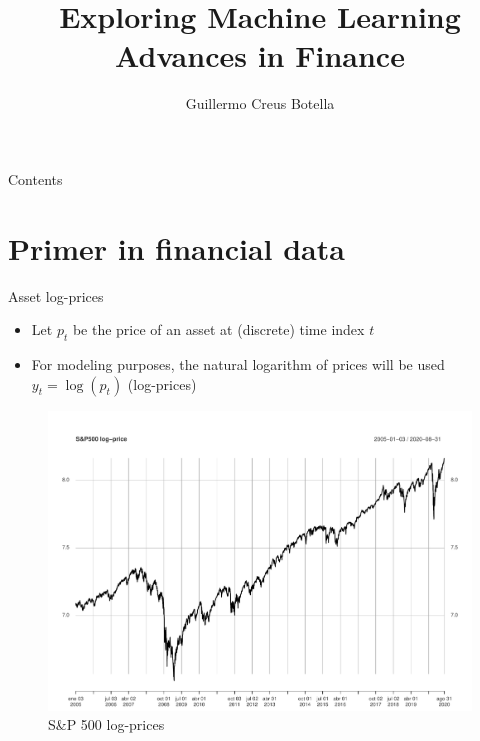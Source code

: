 \documentclass{beamer} %
\title[Exploring ML Advances in Finance]
{Exploring Machine Learning Advances in Finance}
\author[GCB]{Guillermo Creus Botella}
\date{\displaydate{date}}
\begin{document}
\begin{frame}
	\maketitle
\end{frame}

\begin{frame}{Contents}
	\tableofcontents
\end{frame}

\section{Primer in financial data}
\begin{frame}{Asset log-prices}
	\begin{itemize}
		\item Let $p_t$ be the price of an asset at (discrete) time index $t$
		
		\item For modeling purposes, the natural logarithm of prices will be 
		used $y_t = \log (p_t)$ (log-prices)
	\end{itemize}
	
	\begin{figure}
		\centering
		\includegraphics[scale=.25]{img/SP500}
		\caption{S\&P 500 log-prices}
	\end{figure}
\end{frame}
\end{document}
